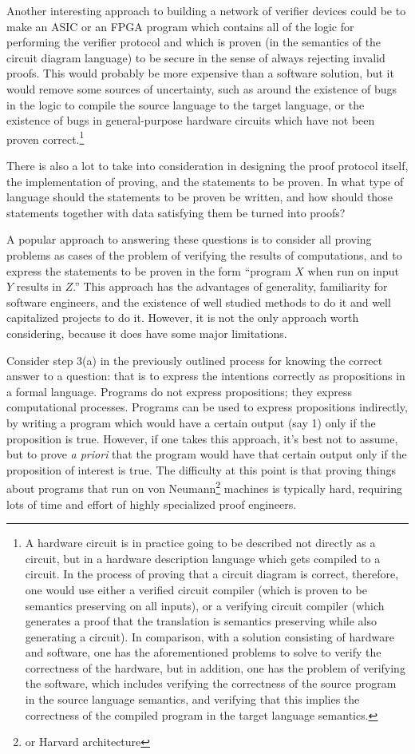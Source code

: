 \documentclass[11pt]{article}
\begin{document}
Another interesting approach to building a network of verifier devices could be to
make an ASIC or an FPGA program which contains all of the logic for
performing the verifier protocol and which is proven (in the semantics of the circuit diagram
language) to be secure in the sense of always rejecting invalid proofs. This would
probably be more expensive than a software solution, but it would remove some sources
of uncertainty, such as around the existence of bugs in the logic to compile the source
language to the target language, or the existence of bugs in general-purpose hardware
circuits which have not been proven correct.\footnote{A hardware circuit is in practice
going to be described not directly as a circuit, but in a hardware description language
which gets compiled to a circuit. In the process of proving that a circuit diagram is
correct, therefore, one would use either a verified circuit compiler (which is proven to
be semantics preserving on all inputs), or a verifying circuit compiler (which generates
a proof that the translation is semantics preserving while also generating a circuit).
In comparison, with a solution consisting of hardware and software, one has the aforementioned
problems to solve to verify the correctness of the hardware, but in addition, one has
the problem of verifying the software, which includes verifying the correctness of the
source program in the source language semantics, and verifying that this implies the
correctness of the compiled program in the target language semantics.}

There is also a lot to take into consideration in designing the proof protocol itself,
the implementation of proving, and the statements to be proven. In what type of language
should the statements to be proven be written, and how should those statements together
with data satisfying them be turned into proofs?

A popular approach to answering these questions is to consider all proving problems
as cases of the problem of verifying the results of computations, and to express the
statements to be proven in the form ``program $X$ when run on input $Y$ results in $Z$.''
This approach has the advantages of generality, familiarity for software engineers, and the
existence of well studied methods to do it and well capitalized projects to do it.
However, it is not the only approach worth considering, because it does have some
major limitations. 

Consider step 3(a) in the previously outlined process for knowing the correct answer
to a question: that is to express the intentions correctly as propositions in a formal
language. Programs do not express propositions; they express computational processes.
Programs can be used to express propositions indirectly, by writing a program which
would have a certain output (say 1) only if the proposition is true. However, if one
takes this approach, it's best not to assume, but to prove \emph{a priori}\/ that
the program would have that certain output only if the proposition of interest is true.
The difficulty at this point is that proving things about programs that run on von
Neumann\footnote{or Harvard architecture} machines is typically hard, requiring
lots of time and effort of highly specialized proof engineers.
\end{document}
